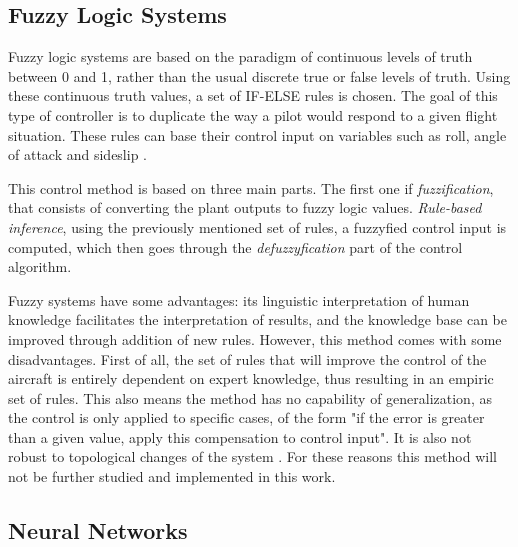 \subsection{Fuzzy Logic Systems}
\label{section:background/fuzzy_logic}

Fuzzy logic systems are based on the paradigm of continuous levels of truth between 0 and 1, rather than the usual discrete true or false levels of truth. Using these continuous truth values, a set of IF-ELSE rules is chosen. The goal of this type of controller is to duplicate the way a pilot would respond to a given flight situation. These rules can base their control input on variables such as roll, angle of attack and sideslip \cite{Comparison_IntelligentSys}. 

This control method is based on three main parts. The first one if \textit{fuzzification}, that consists of converting the plant outputs to fuzzy logic values. \textit{Rule-based inference}, using the previously mentioned set of rules, a fuzzyfied control input is computed, which then goes through the \textit{defuzzyfication} part of the control algorithm.

Fuzzy systems have some advantages: its linguistic interpretation of human knowledge facilitates the interpretation of results, and the knowledge base can be improved through addition of new rules. However, this method comes with some disadvantages. First of all, the set of rules that will improve the control of the aircraft is entirely dependent on expert knowledge, thus resulting in an empiric set of rules. This also means the method has no capability of generalization, as the control is only applied to specific cases, of the form "if the error is greater than a given value, apply this compensation to control input". It is also not robust to topological changes of the system \cite{Neuro_fuzzy_survey}. For these reasons this method will not be further studied and implemented in this work.


\subsection{Neural Networks}
\label{section:background/NN}


